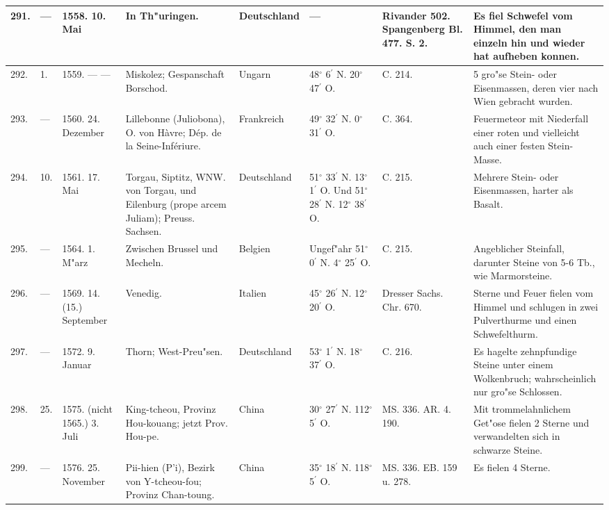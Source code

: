 \documentclass[a4paper, 8pt, oneside, polutonikogreek, german]{article}
\begin{document}
\begin{center}
\begin{longtable}{| p{5mm} | p{3mm} | p{15mm} | p{25mm} | p{20mm} | p{14mm} | p{17mm} | p{24mm} |}
        291. & --- & 1558. 10. Mai & In Th"uringen. & Deutschland & --- & Rivander 502. Spangenberg Bl. 477. S. 2. & Es fiel Schwefel vom Himmel, den man einzeln hin und wieder hat aufheben konnen. \\ \hline
        292. & 1. & 1559. --- --- & Miskolez; Gespanschaft Borschod. & Ungarn & 48$^\circ$ 6$^\prime$ N. 20$^\circ$ 47$^\prime$ O. & C. 214. & 5 gro"se Stein- oder Eisenmassen, deren vier nach Wien gebracht wurden. \\ \hline
        293. & --- & 1560. 24. Dezember & Lillebonne (Juliobona), O. von Hàvre; Dép. de la Seine-Infériure. & Frankreich & 49$^\circ$ 32$^\prime$ N. 0$^\circ$ 31$^\prime$ O. & C. 364. & Feuermeteor mit Niederfall einer roten und vielleicht auch einer festen Stein-Masse. \\ \hline
        294. & 10. & 1561. 17. Mai & Torgau, Siptitz, WNW. von Torgau, und Eilenburg (prope arcem Juliam); Preuss. Sachsen. & Deutschland & 51$^\circ$ 33$^\prime$ N. 13$^\circ$ 1$^\prime$ O. Und 51$^\circ$ 28$^\prime$ N. 12$^\circ$ 38$^\prime$ O. & C. 215. & Mehrere Stein- oder Eisenmassen, harter als Basalt. \\ \hline
        295. & --- & 1564. 1. M"arz & Zwischen Brussel und Mecheln. & Belgien & Ungef"ahr 51$^\circ$ 0$^\prime$ N. 4$^\circ$ 25$^\prime$ O. & C. 215. & Angeblicher Steinfall, darunter Steine von 5-6 Tb., wie Marmorsteine. \\ \hline
        296. & --- & 1569. 14. (15.) September & Venedig. & Italien & 45$^\circ$ 26$^\prime$ N. 12$^\circ$ 20$^\prime$ O. & Dresser Sachs. Chr. 670. & Sterne und Feuer fielen vom Himmel und schlugen in zwei Pulverthurme und einen Schwefelthurm. \\ \hline
        297. & --- & 1572. 9. Januar & Thorn; West-Preu"sen. & Deutschland & 53$^\circ$ 1$^\prime$ N. 18$^\circ$ 37$^\prime$ O. & C. 216. & Es hagelte zehnpfundige Steine unter einem Wolkenbruch; wahrscheinlich nur gro"se Schlossen. \\ \hline
        298. & 25. & 1575. (nicht 1565.) 3. Juli & King-tcheou, Provinz Hou-kouang; jetzt Prov. Hou-pe. & China & 30$^\circ$ 27$^\prime$ N. 112$^\circ$ 5$^\prime$ O. & MS. 336. AR. 4. 190. & Mit trommelahnlichem Get"ose fielen 2 Sterne und verwandelten sich in schwarze Steine. \\ \hline
        299. & --- & 1576. 25. November & Pii-hien (P’i), Bezirk von Y-tcheou-fou; Provinz Chan-toung. & China & 35$^\circ$ 18$^\prime$ N. 118$^\circ$ 5$^\prime$ O. & MS. 336. EB. 159 u. 278. & Es fielen 4 Sterne. \\ \hline

\end{longtable}
\end{center}
\end{document}
